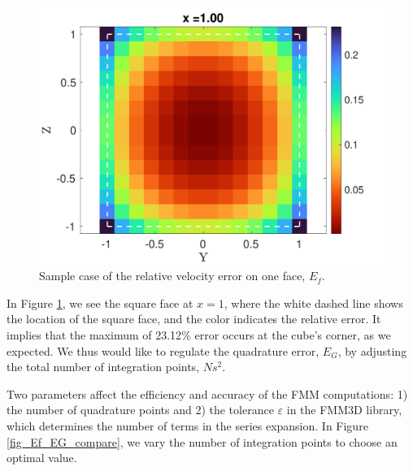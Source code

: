 \begin{figure}[h]
	\begin{center}
		\includegraphics[scale=0.3]{./figures/fig_corner_err}
	\caption{Sample case of the relative velocity error on one face, $E_f$.}
	\label{fig_corner_err}
\end{center}
\end{figure}
In Figure \ref{fig_corner_err}, we see the square face at $x = 1$, where the white dashed line shows the location of the square face, and the color indicates the relative error. It implies that the maximum of 23.12$\%$ error occurs at the cube's corner, as we expected. We thus would like to regulate the quadrature error, $E_G$, by adjusting the total number of integration points, $Ns^2$.
\par
Two parameters affect the efficiency and accuracy of the FMM computations: 1) the number of quadrature points and 2) the tolerance $\varepsilon$ in the FMM3D library, which determines the number of terms in the series expansion.
In Figure \ref{fig_Ef_EG_compare}, we vary the number of integration points to choose an optimal value. 
